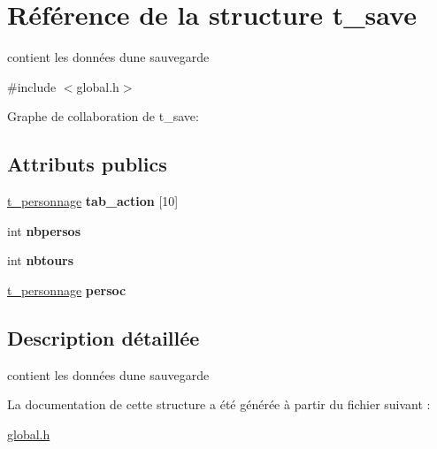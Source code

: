 \hypertarget{a00011}{}\section{Référence de la structure t\+\_\+save}
\label{a00011}


contient les données d\textquotesingle{}une sauvegarde  




{\ttfamily \#include $<$global.\+h$>$}



Graphe de collaboration de t\+\_\+save\+:
\subsection*{Attributs publics}
\begin{DoxyCompactItemize}
\item 
\hyperlink{a00010}{t\+\_\+personnage} {\bfseries tab\+\_\+action} \mbox{[}10\mbox{]}\hypertarget{a00011_a680cbb0935fc627ad4ad6b04d817d8ed}{}\label{a00011_a680cbb0935fc627ad4ad6b04d817d8ed}

\item 
int {\bfseries nbpersos}\hypertarget{a00011_a09cb4efc30f247f058ac7f06cfd68ea6}{}\label{a00011_a09cb4efc30f247f058ac7f06cfd68ea6}

\item 
int {\bfseries nbtours}\hypertarget{a00011_aa7248684bb8d898267db7a53c686300e}{}\label{a00011_aa7248684bb8d898267db7a53c686300e}

\item 
\hyperlink{a00010}{t\+\_\+personnage} {\bfseries persoc}\hypertarget{a00011_aa64b88d5005df8ec9723c01009644929}{}\label{a00011_aa64b88d5005df8ec9723c01009644929}

\end{DoxyCompactItemize}


\subsection{Description détaillée}
contient les données d\textquotesingle{}une sauvegarde 

La documentation de cette structure a été générée à partir du fichier suivant \+:\begin{DoxyCompactItemize}
\item 
\hyperlink{a00022}{global.\+h}\end{DoxyCompactItemize}
